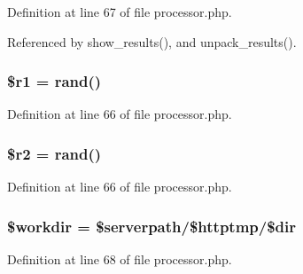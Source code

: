 Definition at line 67 of file processor.php.

Referenced by show\_\-results(), and unpack\_\-results().
\subsubsection{\setlength{\rightskip}{0pt plus 5cm}\$r1 = rand()}\label{processor_8php_a1}




Definition at line 66 of file processor.php.
\subsubsection{\setlength{\rightskip}{0pt plus 5cm}\$r2 = rand()}\label{processor_8php_a2}




Definition at line 66 of file processor.php.
\subsubsection{\setlength{\rightskip}{0pt plus 5cm}\$workdir = \$serverpath/\$httptmp/\$dir}\label{processor_8php_a4}




Definition at line 68 of file processor.php.